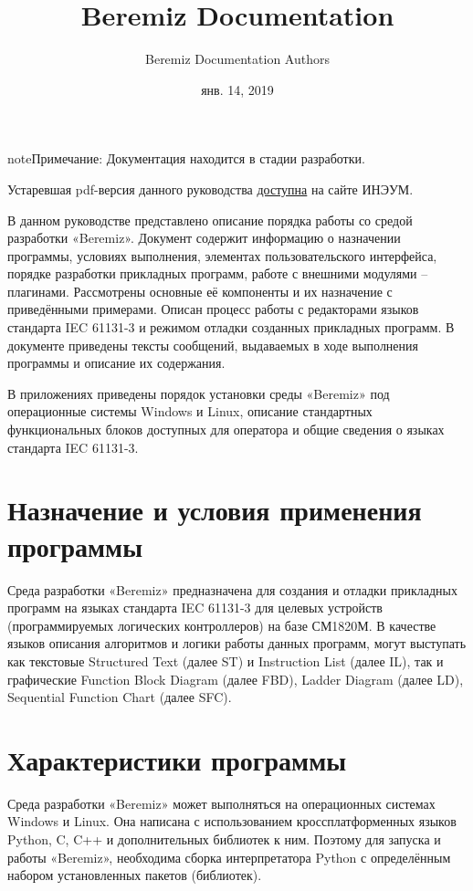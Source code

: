 \documentclass[letterpaper,10pt,russian]{sphinxmanual}
\title{Beremiz Documentation}
\date{янв. 14, 2019}
\author{Beremiz Documentation Authors}
\begin{document}
\maketitle
\tableofcontents
{}\label{index::doc}
\begin{notice}{note}{Примечание:}
Документация находится в стадии разработки.

Устаревшая pdf-версия данного руководства \href{http://www.sm1820.com.ru/files/beremiz/beremiz\_manual.pdf}{доступна} на сайте ИНЭУМ.
\end{notice}



В данном руководстве представлено описание порядка работы со средой разработки «Beremiz». Документ содержит информацию о назначении программы, условиях выполнения, элементах пользовательского интерфейса, порядке разработки прикладных программ, работе с внешними модулями – плагинами. Рассмотрены основные её компоненты и их назначение с приведёнными примерами. Описан процесс работы с редакторами языков стандарта IEC 61131-3 и режимом отладки созданных прикладных программ. В документе приведены тексты сообщений, выдаваемых в ходе выполнения программы и описание их содержания.

В приложениях приведены порядок установки среды «Beremiz» под операционные системы Windows и Linux, описание стандартных функциональных блоков доступных для оператора и общие сведения о языках стандарта IEC 61131-3.


\chapter{Назначение и условия применения программы}
\label{index:beremiz}\label{index:id2}
Среда разработки «Beremiz» предназначена для создания и отладки
прикладных программ на языках стандарта IEC 61131-3 для целевых
устройств (программируемых логических контроллеров) на базе СМ1820М. В
качестве языков описания алгоритмов и логики работы данных программ,
могут выступать как текстовые Structured Text (далее ST) и Instruction
List (далее IL), так и графические Function Block Diagram (далее FBD),
Ladder Diagram (далее LD), Sequential Function Chart (далее SFC).


\chapter{Характеристики программы}
\label{index:id3}
Среда разработки «Beremiz» может выполняться на операционных системах
Windows и Linux. Она написана с использованием кроссплатформенных языков
Python, C, C++ и дополнительных библиотек к ним. Поэтому для запуска и
работы «Beremiz», необходима сборка интерпретатора Python с определённым
набором установленных пакетов (библиотек).
\end{document}
